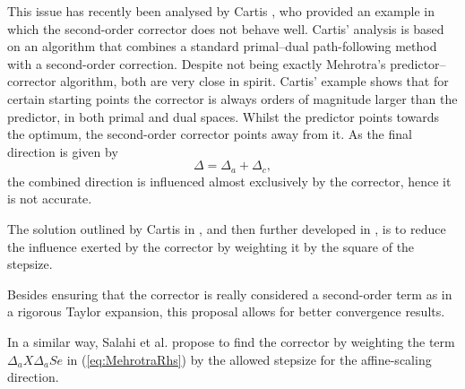 
This issue has recently been analysed by Cartis \cite{Cartis04}, 
who provided an example in which the second-order corrector does 
not behave well. Cartis' analysis is based on an algorithm 
that combines a standard primal--dual path-following method with 
a second-order correction. Despite not being exactly Mehrotra's 
predictor--corrector algorithm, both are very close in spirit.
Cartis' example shows that for certain starting points the corrector 
is always orders of magnitude larger than the predictor, in both 
primal and dual spaces. Whilst the predictor points towards 
the optimum, the second-order corrector points away from it.
As the final direction is given by
\[
\Delta = \Delta_{a} +\Delta_c,
\]
the combined direction is influenced almost exclusively by the corrector, 
hence it is not accurate. 


The solution outlined by Cartis in \cite{Cartis04}, and then further 
developed in \cite{Cartis05}, is to reduce the influence exerted by 
the corrector by weighting it by the square of the stepsize. 

Besides ensuring that the corrector is really considered 
a second-order term as in a rigorous Taylor expansion, 
this proposal allows for better convergence results.


In a similar way, Salahi et al. \cite{SalahiPengTerlaky} propose to find 
the corrector by weighting the term $\Delta_a X \Delta_a S e$ in 
(\ref{eq:MehrotraRhs}) by the allowed stepsize for the affine-scaling 
direction.


